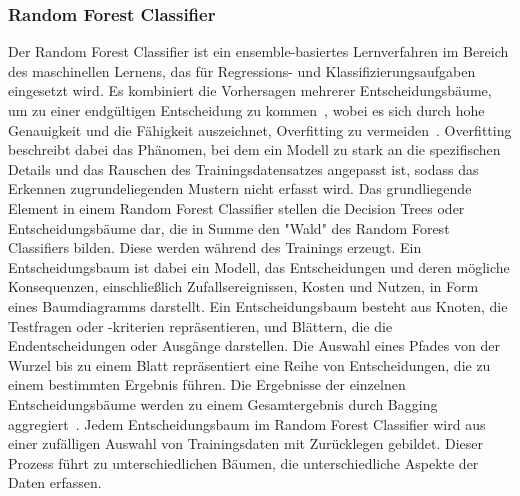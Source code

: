 \pagebreak

\subsubsection*{Random Forest Classifier}
Der Random Forest Classifier ist ein ensemble-basiertes Lernverfahren im Bereich des maschinellen Lernens, das für Regressions- und Klassifizierungsaufgaben eingesetzt wird. Es kombiniert die Vorhersagen mehrerer Entscheidungsbäume, um zu einer endgültigen Entscheidung zu kommen~\cite[S. 456]{10.5555/3133359}, wobei es sich durch hohe Genauigkeit und die Fähigkeit auszeichnet, Overfitting zu vermeiden~\cite[S. 455]{10.5555/3133359}.
Overfitting beschreibt dabei das Phänomen, bei dem ein Modell zu stark an die spezifischen Details und das Rauschen des Trainingsdatensatzes angepasst ist, sodass das Erkennen zugrundeliegenden Mustern nicht erfasst wird.
Das grundliegende Element in einem Random Forest Classifier stellen die Decision Trees oder Entscheidungsbäume dar, die in Summe den "Wald" des Random Forest Classifiers bilden. Diese werden während des Trainings erzeugt.
Ein Entscheidungsbaum ist dabei ein Modell, das Entscheidungen und deren mögliche Konsequenzen, einschließlich Zufallsereignissen, Kosten und Nutzen, in Form eines Baumdiagramms darstellt. Ein Entscheidungsbaum besteht aus Knoten, die Testfragen oder -kriterien repräsentieren, und Blättern, die die Endentscheidungen oder Ausgänge darstellen. Die Auswahl eines Pfades von der Wurzel bis zu einem Blatt repräsentiert eine Reihe von Entscheidungen, die zu einem bestimmten Ergebnis führen.
Die Ergebnisse der einzelnen Entscheidungsbäume werden zu einem Gesamtergebnis durch Bagging aggregiert~\cite[S. 456]{10.5555/3133359}. Jedem Entscheidungsbaum im Random Forest Classifier wird aus einer zufälligen Auswahl von Trainingsdaten mit Zurücklegen gebildet. Dieser Prozess führt zu unterschiedlichen Bäumen, die unterschiedliche Aspekte der Daten erfassen.
